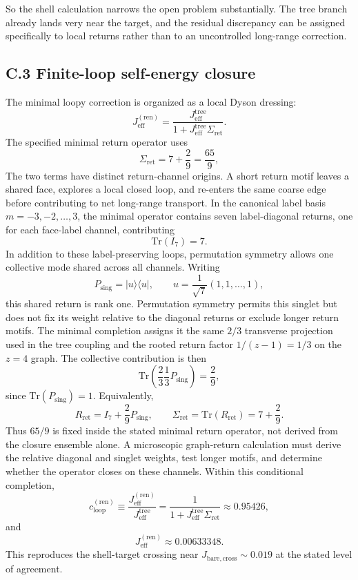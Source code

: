 \documentclass[11pt]{article}
\begin{document}
So the shell calculation narrows the open problem substantially. The tree branch already lands very near the target, and the residual discrepancy can be assigned specifically to local returns rather than to an uncontrolled long-range correction.

\subsection*{C.3 Finite-loop self-energy closure}

The minimal loopy correction is organized as a local Dyson dressing:
\[
J_{\mathrm{eff}}^{(\mathrm{ren})}
=
\frac{J_{\mathrm{eff}}^{\mathrm{tree}}}{1+J_{\mathrm{eff}}^{\mathrm{tree}}\Sigma_{\mathrm{ret}}}.
\]
The specified minimal return operator uses
\[
\Sigma_{\mathrm{ret}}=7+\frac{2}{9}=\frac{65}{9},
\]
The two terms have distinct return-channel origins. A short return motif leaves a shared face, explores a local closed loop, and re-enters the same coarse edge before contributing to net long-range transport. In the canonical label basis $m=-3,-2,\ldots,3$, the minimal operator contains seven label-diagonal returns, one for each face-label channel, contributing
\[
\mathrm{Tr}(I_7)=7.
\]
In addition to these label-preserving loops, permutation symmetry allows one collective mode shared across all channels. Writing
\[
P_{\mathrm{sing}}=|u\rangle\langle u|,
\qquad
u=\frac{1}{\sqrt 7}(1,1,\ldots,1),
\]
this shared return is rank one. Permutation symmetry permits this singlet but does not fix its weight relative to the diagonal returns or exclude longer return motifs. The minimal completion assigns it the same $2/3$ transverse projection used in the tree coupling and the rooted return factor $1/(z-1)=1/3$ on the $z=4$ graph. The collective contribution is then
\[
\mathrm{Tr}\!\left(\frac{2}{3}\frac{1}{3}P_{\mathrm{sing}}\right)=\frac{2}{9},
\]
since $\mathrm{Tr}(P_{\mathrm{sing}})=1$. Equivalently,
\[
R_{\mathrm{ret}}=I_7+\frac{2}{9}P_{\mathrm{sing}},
\qquad
\Sigma_{\mathrm{ret}}=\mathrm{Tr}(R_{\mathrm{ret}})=7+\frac{2}{9}.
\]
Thus $65/9$ is fixed inside the stated minimal return operator, not derived from the closure ensemble alone. A microscopic graph-return calculation must derive the relative diagonal and singlet weights, test longer motifs, and determine whether the operator closes on these channels. Within this conditional completion,
\[
c_{\mathrm{loop}}^{(\mathrm{ren})}
\equiv
\frac{J_{\mathrm{eff}}^{(\mathrm{ren})}}{J_{\mathrm{eff}}^{\mathrm{tree}}}
=
\frac{1}{1+J_{\mathrm{eff}}^{\mathrm{tree}}\Sigma_{\mathrm{ret}}}
\approx 0.95426,
\]
and
\[
J_{\mathrm{eff}}^{(\mathrm{ren})}\approx 0.00633348.
\]
This reproduces the shell-target crossing near $J_{\mathrm{bare,cross}}\sim 0.019$ at the stated level of agreement.
\end{document}
